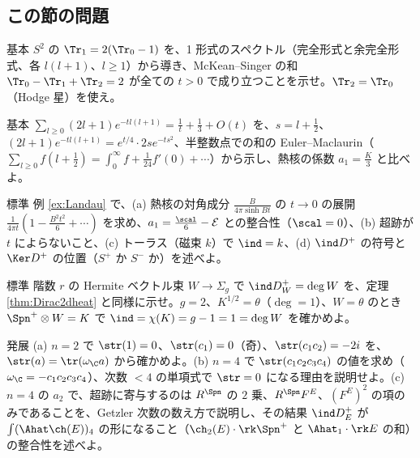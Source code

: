\subsection*{この節の問題}
\begin{prob}{基本}\label{p:MSS2}
$S^2$ の $\Tr_1=2(\Tr_0-1)$ を、1 形式のスペクトル（完全形式と余完全形式、各 $l(l+1)$、$l\ge1$）から導き、McKean--Singer の和 $\Tr_0-\Tr_1+\Tr_2=2$ が全ての $t>0$ で成り立つことを示せ。$\Tr_2=\Tr_0$（Hodge 星）を使え。
\end{prob}
\begin{prob}{基本}\label{p:a1S2}
$\sum_{l\ge0}(2l+1)e^{-tl(l+1)}=\frac1t+\frac13+O(t)$ を、$s=l+\frac12$、$(2l+1)e^{-tl(l+1)}=e^{t/4}\cdot2se^{-ts^2}$、半整数点での和の Euler--Maclaurin（$\sum_{l\ge0}f(l+\frac12)=\int_0^\infty f+\frac1{24}f'(0)+\cdots$）から示し、熱核の係数 $a_1=\frac K3$ と比べよ。
\end{prob}
\begin{prob}{標準}\label{p:landau}
例 \ref{ex:Landau} で、(a) 熱核の対角成分 $\frac B{4\pi\sinh Bt}$ の $t\to0$ の展開 $\frac1{4\pi t}(1-\frac{B^2t^2}6+\cdots)$ を求め、$a_1=\frac{\scal}6-\mathcal E$ との整合性（$\scal=0$）、(b) 超跡が $t$ によらないこと、(c) トーラス（磁束 $k$）で $\ind=k$、(d) $\ind D^+$ の符号と $\Ker D^+$ の位置（$S^+$ か $S^-$ か）を述べよ。
\end{prob}
\begin{prob}{標準}\label{p:dirac2d}
階数 $r$ の Hermite ベクトル束 $W\to\Sigma_g$ で $\ind D_W^+=\deg W$ を、定理 \ref{thm:Dirac2dheat} と同様に示せ。$g=2$、$K^{1/2}=\theta$（$\deg=1$）、$W=\theta$ のとき $\Spn^+\otimes W=K$ で $\ind=\chi(K)=g-1=1=\deg W$ を確かめよ。
\end{prob}
\begin{prob}{発展}\label{p:gen}
(a) $n=2$ で $\str(1)=0$、$\str(c_1)=0$（奇）、$\str(c_1c_2)=-2i$ を、$\str(a)=\tr(\omega_{\C}a)$ から確かめよ。(b) $n=4$ で $\str(c_1c_2c_3c_4)$ の値を求め（$\omega_{\C}=-c_1c_2c_3c_4$）、次数 $<4$ の単項式で $\str=0$ になる理由を説明せよ。(c) $n=4$ の $a_2$ で、超跡に寄与するのは $R^{\Spn}$ の $2$ 乗、$R^{\Spn}F^E$、$(F^E)^2$ の項のみであることを、Getzler 次数の数え方で説明し、その結果 $\ind D_E^+$ が $\int(\Ahat\ch(E))_4$ の形になること（$\ch_2(E)\cdot\rk\Spn^+$ と $\Ahat_1\cdot\rk E$ の和）の整合性を述べよ。
\end{prob}

